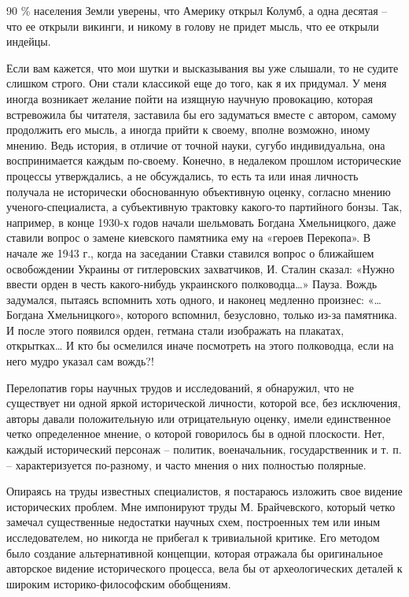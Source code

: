 90 \% населения Земли уверены, что Америку открыл Колумб, а одна десятая – что
ее открыли викинги, и никому в голову не придет мысль, что ее открыли индейцы.

Если вам кажется, что мои шутки и высказывания вы уже слышали, то не судите
слишком строго. Они стали классикой еще до того, как я их придумал. У меня
иногда возникает желание пойти на изящную научную провокацию, которая
встревожила бы читателя, заставила бы его задуматься вместе с автором, самому
продолжить его мысль, а иногда прийти к своему, вполне возможно, иному мнению.
Ведь история, в отличие от точной науки, сугубо индивидуальна, она
воспринимается каждым по-своему. Конечно, в недалеком прошлом исторические
процессы утверждались, а не обсуждались, то есть та или иная личность получала
не исторически обоснованную объективную оценку, согласно мнению
ученого-специалиста, а субъективную трактовку какого-то партийного бонзы. Так,
например, в конце 1930-х годов начали шельмовать Богдана Хмельницкого, даже
ставили вопрос о замене киевского памятника ему на «героев Перекопа». В начале
же 1943 г., когда на заседании Ставки ставился вопрос о ближайшем освобождении
Украины от гитлеровских захватчиков, И. Сталин сказал: «Нужно ввести орден в
честь какого-нибудь украинского полководца…» Пауза. Вождь задумался, пытаясь
вспомнить хоть одного, и наконец медленно произнес: «…Богдана Хмельницкого»,
которого вспомнил, безусловно, только из-за памятника. И после этого появился
орден, гетмана стали изображать на плакатах, открытках… И кто бы осмелился
иначе посмотреть на этого полководца, если на него мудро указал сам вождь?!

Перелопатив горы научных трудов и исследований, я обнаружил, что не существует
ни одной яркой исторической личности, которой все, без исключения, авторы
давали положительную или отрицательную оценку, имели единственное четко
определенное мнение, о которой говорилось бы в одной плоскости. Нет, каждый
исторический персонаж – политик, военачальник, государственник и т. п. –
характеризуется по-разному, и часто мнения о них полностью полярные.

Опираясь на труды известных специалистов, я постараюсь изложить свое видение
исторических проблем. Мне импонируют труды М. Брайчевского, который четко
замечал существенные недостатки научных схем, построенных тем или иным
исследователем, но никогда не прибегал к тривиальной критике. Его методом было
создание альтернативной концепции, которая отражала бы оригинальное авторское
видение исторического процесса, вела бы от археологических деталей к широким
историко-философским обобщениям.

